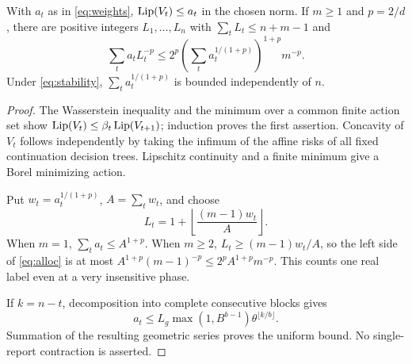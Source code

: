\begin{lemma}\label{lem:allocation}
With $a_t$ as in \eqref{eq:weights}, $\operatorname{Lip}(V_t)\le a_t$ in the chosen norm. If $m\ge1$ and $p=2/d$, there are positive integers $L_1,\ldots,L_n$ with $\sum_tL_t\le n+m-1$ and
\begin{equation}\label{eq:alloc}
 \sum_ta_tL_t^{-p}\le 2^p\left(\sum_ta_t^{1/(1+p)}\right)^{1+p}m^{-p}.
\end{equation}
Under \eqref{eq:stability}, $\sum_ta_t^{1/(1+p)}$ is bounded independently of $n$.
\end{lemma}
\begin{proof}
The Wasserstein inequality and the minimum over a common finite action set show $\operatorname{Lip}(V_t)\le\beta_t\operatorname{Lip}(V_{t+1})$; induction proves the first assertion. Concavity of $V_t$ follows independently by taking the infimum of the affine risks of all fixed continuation decision trees. Lipschitz continuity and a finite minimum give a Borel minimizing action.

Put $w_t=a_t^{1/(1+p)}$, $A=\sum_tw_t$, and choose
\[
 L_t=1+\left\lfloor\frac{(m-1)w_t}{A}\right\rfloor.
\]
When $m=1$, $\sum_ta_t\le A^{1+p}$. When $m\ge2$, $L_t\ge(m-1)w_t/A$, so the left side of \eqref{eq:alloc} is at most $A^{1+p}(m-1)^{-p}\le2^p A^{1+p}m^{-p}$. This counts one real label even at a very insensitive phase.

If $k=n-t$, decomposition into complete consecutive blocks gives
\[
 a_t\le L_g\max(1,B^{b-1})\theta^{\lfloor k/b\rfloor}.
\]
Summation of the resulting geometric series proves the uniform bound. No single-report contraction is asserted.
\end{proof}

